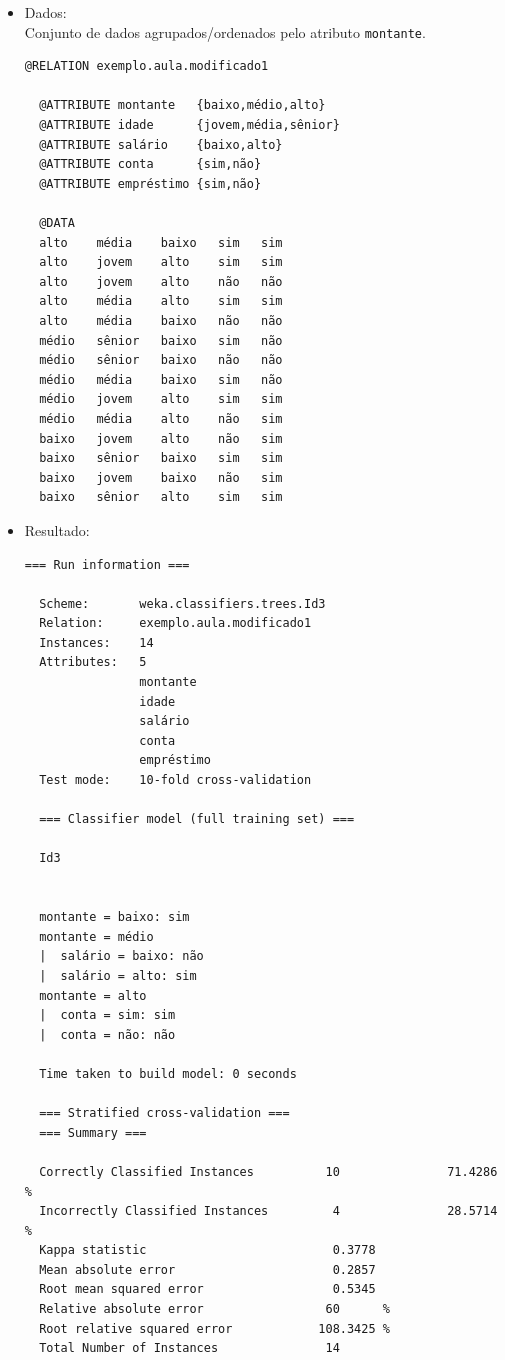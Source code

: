 \documentclass[
    article,            %
    11pt,               %
    oneside,            %
    a4paper,            %
    english,            %
    brazil,             %
    sumario=tradicional,
    ]{abntex2}
\begin{document}
\begin{itemize}
  \item Dados:\\
  Conjunto de dados agrupados/ordenados pelo atributo \texttt{montante}.
  \begin{Verbatim}[frame=single, fontsize=\tiny]
  @RELATION exemplo.aula.modificado1

  @ATTRIBUTE montante   {baixo,médio,alto}
  @ATTRIBUTE idade      {jovem,média,sênior}
  @ATTRIBUTE salário    {baixo,alto}
  @ATTRIBUTE conta      {sim,não}
  @ATTRIBUTE empréstimo {sim,não}

  @DATA
  alto    média    baixo   sim   sim 
  alto    jovem    alto    sim   sim 
  alto    jovem    alto    não   não 
  alto    média    alto    sim   sim 
  alto    média    baixo   não   não 
  médio   sênior   baixo   sim   não 
  médio   sênior   baixo   não   não 
  médio   média    baixo   sim   não 
  médio   jovem    alto    sim   sim 
  médio   média    alto    não   sim 
  baixo   jovem    alto    não   sim 
  baixo   sênior   baixo   sim   sim 
  baixo   jovem    baixo   não   sim 
  baixo   sênior   alto    sim   sim 
  \end{Verbatim}
  
  \item Resultado:
  \begin{Verbatim}[frame=single, fontsize=\tiny]
  === Run information ===

  Scheme:       weka.classifiers.trees.Id3 
  Relation:     exemplo.aula.modificado1
  Instances:    14
  Attributes:   5
                montante
                idade
                salário
                conta
                empréstimo
  Test mode:    10-fold cross-validation

  === Classifier model (full training set) ===

  Id3


  montante = baixo: sim
  montante = médio
  |  salário = baixo: não
  |  salário = alto: sim
  montante = alto
  |  conta = sim: sim
  |  conta = não: não

  Time taken to build model: 0 seconds

  === Stratified cross-validation ===
  === Summary ===

  Correctly Classified Instances          10               71.4286 %
  Incorrectly Classified Instances         4               28.5714 %
  Kappa statistic                          0.3778
  Mean absolute error                      0.2857
  Root mean squared error                  0.5345
  Relative absolute error                 60      %
  Root relative squared error            108.3425 %
  Total Number of Instances               14     


\end{Verbatim}
\end{itemize}
\end{document}
